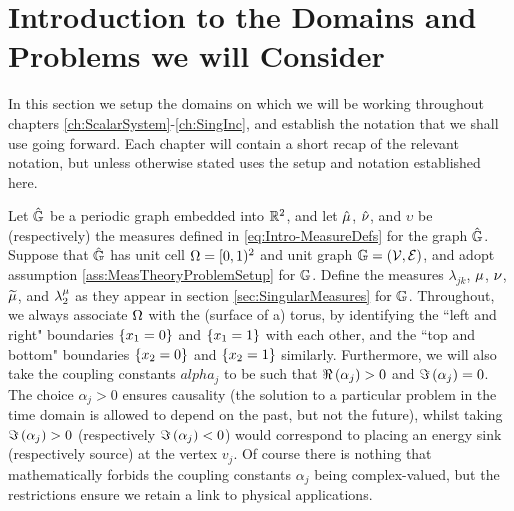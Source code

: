 \section{Introduction to the Domains and Problems we will Consider} \label{sec:TP-DomainSetup}
In this section we setup the domains on which we will be working throughout chapters \ref{ch:ScalarSystem}-\ref{ch:SingInc}, and establish the notation that we shall use going forward.
Each chapter will contain a short recap of the relevant notation, but unless otherwise stated uses the setup and notation established here.

Let $\hat{\mathbb{G}}$ be a periodic graph embedded into $\mathbb{R}^2$, and let $\hat{\mu}$, $\hat{\nu}$, and $\upsilon$ be (respectively) the measures defined in \eqref{eq:Intro-MeasureDefs} for the graph $\hat{\mathbb{G}}$.
Suppose that $\hat{\mathbb{G}}$ has unit cell $\Omega=[0,1)^2$ and unit graph $\mathbb{G}=\left( \mathcal{V}, \mathcal{E} \right)$, and adopt assumption \ref{ass:MeasTheoryProblemSetup} for $\mathbb{G}$.
Define the measures $\lambda_{jk}$, $\mu$, $\nu$, $\widetilde{\mu}$, and $\lambda_2^{\mu}$ as they appear in section \ref{sec:SingularMeasures} for $\mathbb{G}$.
Throughout, we always associate $\Omega$ with the (surface of a) torus, by identifying the ``left and right" boundaries $\left\{ x_1=0 \right\}$ and $\left\{ x_1=1 \right\}$ with each other, and the ``top and bottom" boundaries $\left\{ x_2=0 \right\}$ and $\left\{ x_2=1 \right\}$ similarly.
Furthermore, we will also take the coupling constants $alpha_j$ to be such that $\Re\left( \alpha_j \right)>0$ and $\Im\left( \alpha_j \right) = 0$.
The choice $\alpha_j>0$ ensures causality (the solution to a particular problem in the time domain is allowed to depend on the past, but not the future), whilst taking $\Im\left( \alpha_j \right) > 0$ (respectively $\Im\left( \alpha_j \right) < 0$) would correspond to placing an energy sink (respectively source) at the vertex $v_j$.
Of course there is nothing that mathematically forbids the coupling constants $\alpha_j$ being complex-valued, but the restrictions ensure we retain a link to physical applications. 


